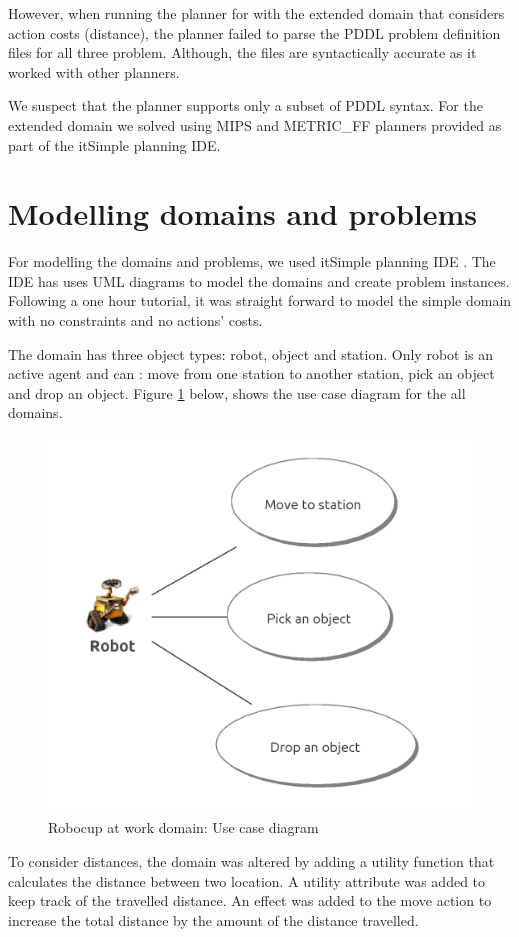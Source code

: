 \documentclass{article}
\begin{document}
However, when running the planner for with the extended domain that considers action costs (distance), the planner failed to parse the PDDL problem definition files for all three problem. Although, the files are syntactically accurate as it worked with other planners. 

We suspect that the planner supports only a subset of PDDL syntax. For the extended domain we solved using MIPS and METRIC\_FF planners provided as part of the itSimple planning IDE.

\section{Modelling domains and problems}

For modelling the domains and problems, we used itSimple planning IDE \cite{itsimple}. The IDE has uses UML diagrams to model the domains and create problem instances. Following a one hour tutorial, it was straight forward to model the simple domain with no constraints and no actions' costs.

The domain has three object types: robot, object and station. Only robot is an active agent and can : move from one station to another station, pick an object and drop an object. Figure \ref{fig:usecase} below, shows the use case diagram for the all domains.

\begin{figure}[H] %
	\centering
	\includegraphics[width=8 cm]{figures/use_case_diagram.png} 
	\caption{Robocup at work domain: Use case diagram}
	\label{fig:usecase}
\end{figure}

To consider distances, the domain was altered by adding a utility function that calculates the distance between two location. A utility attribute was added to keep track of the travelled distance. An effect was added to the move action to increase the total distance by the amount of the distance travelled.
\end{document}
